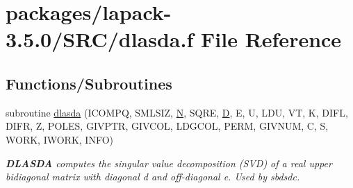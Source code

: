 \hypertarget{dlasda_8f}{}\section{packages/lapack-\/3.5.0/\+S\+R\+C/dlasda.f File Reference}
\label{dlasda_8f}
\subsection*{Functions/\+Subroutines}
\begin{DoxyCompactItemize}
\item 
subroutine \hyperlink{group__auxOTHERauxiliary_gaf8abcba620b2d5a1321889fd86cb3f12}{dlasda} (I\+C\+O\+M\+P\+Q, S\+M\+L\+S\+I\+Z, \hyperlink{polmisc_8c_a0240ac851181b84ac374872dc5434ee4}{N}, S\+Q\+R\+E, \hyperlink{odrpack_8h_a7dae6ea403d00f3687f24a874e67d139}{D}, E, U, L\+D\+U, V\+T, K, D\+I\+F\+L, D\+I\+F\+R, Z, P\+O\+L\+E\+S, G\+I\+V\+P\+T\+R, G\+I\+V\+C\+O\+L, L\+D\+G\+C\+O\+L, P\+E\+R\+M, G\+I\+V\+N\+U\+M, C, S, W\+O\+R\+K, I\+W\+O\+R\+K, I\+N\+F\+O)
\begin{DoxyCompactList}\small\item\em {\bfseries D\+L\+A\+S\+D\+A} computes the singular value decomposition (S\+V\+D) of a real upper bidiagonal matrix with diagonal d and off-\/diagonal e. Used by sbdsdc. \end{DoxyCompactList}\end{DoxyCompactItemize}
